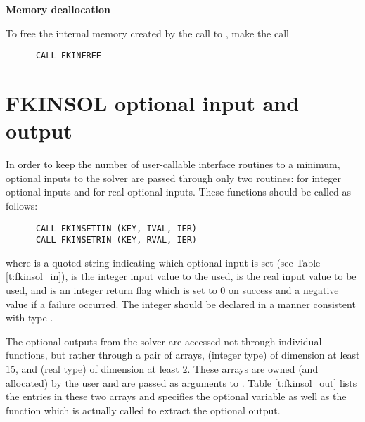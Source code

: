 \begin{Steps}
\item {\bf Memory deallocation}

  To free the internal memory created by the call to ,
  make the call
\begin{verbatim}
      CALL FKINFREE
\end{verbatim}

\end{Steps}


\section{FKINSOL optional input and output}\label{fkin_opt_inout}

In order to keep the number of user-callable {\fkinsol} interface routines to
a minimum, optional inputs to the {\kinsol} solver are passed through only two
routines:  for integer optional inputs and 
for real optional inputs. These functions should be called as follows:
\begin{verbatim}
      CALL FKINSETIIN (KEY, IVAL, IER)
      CALL FKINSETRIN (KEY, RVAL, IER)
\end{verbatim}
where  is a quoted string indicating which optional input is set
(see Table \ref{t:fkinsol_in}),
 is the integer input value to the used,
 is the real input value to be used, and
 is an integer return flag which is set to $0$ on success and
a negative value if a failure occurred.
The integer  should be declared in a manner consistent with {\C}
type .

The optional outputs from the {\kinsol} solver are accessed not through
individual functions, but rather through a pair of arrays, 
(integer type) of dimension at least $15$, and  (real type) of
dimension at least $2$.  These arrays are owned (and allocated) by the user
and are passed as arguments to .
Table \ref{t:fkinsol_out} lists the entries in these two arrays and specifies the
optional variable as well as the {\kinsol} function which is actually called to
extract the optional output.

